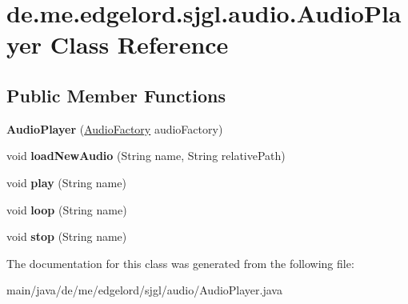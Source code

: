 \hypertarget{classde_1_1me_1_1edgelord_1_1sjgl_1_1audio_1_1_audio_player}{}\section{de.\+me.\+edgelord.\+sjgl.\+audio.\+Audio\+Player Class Reference}
\label{classde_1_1me_1_1edgelord_1_1sjgl_1_1audio_1_1_audio_player}
\subsection*{Public Member Functions}
\begin{DoxyCompactItemize}
\item 
\mbox{\label{classde_1_1me_1_1edgelord_1_1sjgl_1_1audio_1_1_audio_player_aa2ce9d41080a96a25e09f9b0830e7b04}} 
{\bfseries Audio\+Player} (\mbox{\hyperlink{classde_1_1me_1_1edgelord_1_1sjgl_1_1factory_1_1_audio_factory}{Audio\+Factory}} audio\+Factory)
\item 
\mbox{\label{classde_1_1me_1_1edgelord_1_1sjgl_1_1audio_1_1_audio_player_a3fa42a34769a40aaf94c16e1589f7b09}} 
void {\bfseries load\+New\+Audio} (String name, String relative\+Path)
\item 
\mbox{\label{classde_1_1me_1_1edgelord_1_1sjgl_1_1audio_1_1_audio_player_aecce0a524758259586949e7fb0c477d6}} 
void {\bfseries play} (String name)
\item 
\mbox{\label{classde_1_1me_1_1edgelord_1_1sjgl_1_1audio_1_1_audio_player_a4773c3bc2054fcb5f7892ebf330c68b8}} 
void {\bfseries loop} (String name)
\item 
\mbox{\label{classde_1_1me_1_1edgelord_1_1sjgl_1_1audio_1_1_audio_player_a52bd650d815c823dc0a5e99b4aeba927}} 
void {\bfseries stop} (String name)
\end{DoxyCompactItemize}


The documentation for this class was generated from the following file\+:\begin{DoxyCompactItemize}
\item 
main/java/de/me/edgelord/sjgl/audio/Audio\+Player.\+java\end{DoxyCompactItemize}
